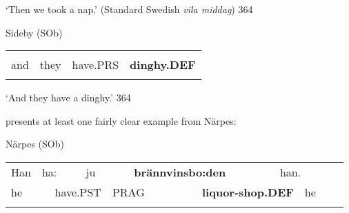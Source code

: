 \begin{styleTranslation}
‘Then we took a nap.’ (Standard Swedish \textit{vila middag}) 364

\end{styleTranslation}

\begin{listWWNumileveli}
\item 

\begin{styleExample}
Sideby (SOb)

\end{styleExample}

\end{listWWNumileveli}

\begin{tabular}{llll}
\lsptoprule
\multicolumn{4}{l}{Å

}\\
and & they & have.PRS & {\bfseries dinghy.DEF}\\
\lspbottomrule
\end{tabular}

\begin{styleTranslation}
‘And they have a dinghy.’ 364

\end{styleTranslation}

\begin{styleBodyTextFirst}
\citet{Ivars2005} presents at least one fairly clear example from Närpes:

\end{styleBodyTextFirst}

\begin{listWWNumileveli}
\item 

\begin{styleExample}
Närpes (SOb)

\end{styleExample}

\end{listWWNumileveli}

\begin{tabular}{llllllllllll}
\lsptoprule
Han & \multicolumn{2}{l}{ha:

} & \multicolumn{2}{l}{ju

} & \multicolumn{2}{l}{{\bfseries brännvinsbo:den}

} & \multicolumn{2}{l}{han.

} & \multicolumn{2}{l}{} & \\
\multicolumn{2}{l}{he

} & \multicolumn{2}{l}{have.PST

} & \multicolumn{2}{l}{PRAG

} & \multicolumn{2}{l}{{\bfseries liquor-shop.DEF}

} & \multicolumn{2}{l}{he

} & \multicolumn{2}{l}{}\\
\lspbottomrule
\end{tabular}

